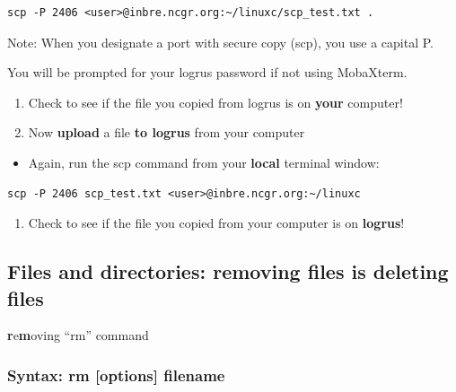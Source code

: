 \documentclass[
]{book}
\providecommand{\tightlist}{%
  \setlength{\itemsep}{0pt}\setlength{\parskip}{0pt}}
\begin{document}
\begin{verbatim}
scp -P 2406 <user>@inbre.ncgr.org:~/linuxc/scp_test.txt .
\end{verbatim}

Note: When you designate a port with secure copy (scp), you use a capital P.

You will be prompted for your logrus password if not using MobaXterm.

\begin{enumerate}
\def\labelenumi{\arabic{enumi})}
\setcounter{enumi}{3}
\item
  Check to see if the file you copied from logrus is on \textbf{your} computer!
\item
  Now \textbf{upload} a file \textbf{to logrus} from your computer
\end{enumerate}

\begin{itemize}
\tightlist
\item
  Again, run the scp command from your \textbf{local} terminal window:
\end{itemize}

\begin{verbatim}
scp -P 2406 scp_test.txt <user>@inbre.ncgr.org:~/linuxc
\end{verbatim}

\begin{enumerate}
\def\labelenumi{\arabic{enumi})}
\setcounter{enumi}{5}
\tightlist
\item
  Check to see if the file you copied from your computer is on \textbf{logrus}!
\end{enumerate}

\hypertarget{files-and-directories-removing-files-is-deleting-files}{%
\subsection{Files and directories: removing files is deleting files}\label{files-and-directories-removing-files-is-deleting-files}}

\textbf{r}e\textbf{m}oving ``rm'' command

\hypertarget{syntax-rm-options-filename}{%
\subsubsection*{Syntax: rm {[}options{]} filename}\label{syntax-rm-options-filename}}
\end{document}
